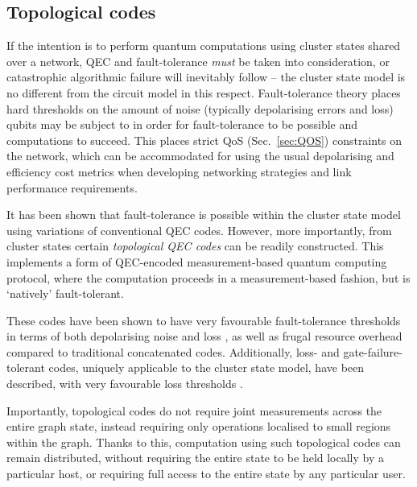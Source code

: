 \documentclass[aps, rmp, twocolumn, amsmath, amssymb, nofootinbib, superscriptaddress, longbibliography, floatfix, table-of-contents, eqsecnum]{revtex4-1}
\begin{document}
%
%

\subsection{Topological codes} \label{sec:topol_codes} 

If the intention is to perform quantum computations using cluster states shared over a network, QEC and fault-tolerance \textit{must} be taken into consideration, or catastrophic algorithmic failure will inevitably follow -- the cluster state model is no different from the circuit model in this respect. Fault-tolerance theory places hard thresholds on the amount of noise (typically depolarising errors and loss) qubits may be subject to in order for fault-tolerance to be possible and computations to succeed. This places strict QoS (Sec.~\ref{sec:QOS}) constraints on the network, which can be accommodated for using the usual depolarising and efficiency cost metrics when developing networking strategies and link performance requirements.

It has been shown that fault-tolerance is possible within the cluster state model \cite{bib:NielsenDawson04, bib:Dawson06} using variations of conventional QEC codes. However, more importantly, from cluster states certain \textit{topological QEC codes} \cite{???} can be readily constructed. This implements a form of QEC-encoded measurement-based quantum computing protocol, where the computation proceeds in a measurement-based fashion, but is `natively' fault-tolerant.

These codes have been shown to have very favourable fault-tolerance thresholds in terms of both depolarising noise and loss \cite{bib:StaceBarrettDohertyLoss, bib:BarrettStaceFT}, as well as frugal resource overhead compared to traditional concatenated codes. Additionally, loss- and gate-failure-tolerant codes, uniquely applicable to the cluster state model, have been described, with very favourable loss thresholds \cite{bib:Varnava05, bib:RalphHayes05, bib:Duan05}. 

Importantly, topological codes do not require joint measurements across the entire graph state, instead requiring only operations localised to small regions within the graph. Thanks to this, computation using such topological codes can remain distributed, without requiring the entire state to be held locally by a particular host, or requiring full access to the entire state by any particular user.
\end{document}
